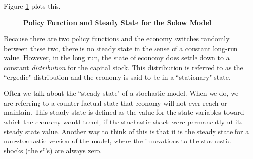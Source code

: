 \documentclass[letterpaper,12pt]{article}
\theoremstyle{definition}
\begin{document}
\begin{spacing}{1.5}
			Figure \ref{DSGE_Solow2_Fig} plots this.
			\begin{figure}[htb]\centering \captionsetup{width=4.0in}
			   \caption{\label{DSGE_Solow2_Fig}\textbf{Policy Function and Steady State for the Solow Model}}
			\end{figure}
			Because there are two policy functions and the economy switches randomly between these two, there is no steady state in the sense of a constant long-run value. However, in the long run, the state of economy does settle down to a constant \emph{distribution} for the capital stock. This distribution is referred to as the ``ergodic" distribution and the economy is said to be in a ``stationary" state.

			Often we talk about the ``steady state" of a stochastic model. When we do, we are referring to a counter-factual state that economy will not ever reach or maintain. This steady state is defined as the value for the state variables toward which the economy would trend, if the stochastic shock were permanently at its steady state value. Another way to think of this is that it is the steady state for a non-stochastic version of the model, where the innovations to the stochastic shocks (the $\epsilon^z$'s) are always zero.


\end{spacing}
\end{document}
